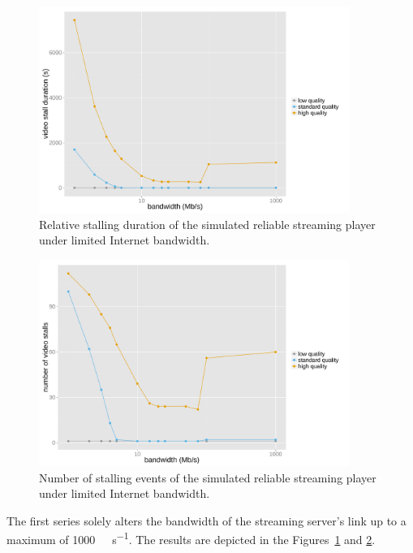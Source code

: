 \begin{figure}[htb]
	\centering
	\includegraphics[width=0.9\textwidth]{images/R-ltesim-bwseries-stallduration.pdf}
	\caption{Relative stalling duration of the simulated reliable streaming player under limited Internet bandwidth.}
\label{c6:fig:ltesim-bwseries-stallduration}
\end{figure}

\begin{figure}[htb]
	\centering
	\includegraphics[width=0.9\textwidth]{images/R-ltesim-bwseries-numstalls.pdf}
	\caption{Number of stalling events of the simulated reliable streaming player under limited Internet bandwidth.}
\label{c6:fig:ltesim-bwseries-numstalls}
\end{figure}

The first series solely alters the bandwidth of the streaming server's link up to a maximum of \SI{1000}{\mega\bit\per\second}. The results are depicted in the Figures~\ref{c6:fig:ltesim-bwseries-stallduration} and \ref{c6:fig:ltesim-bwseries-numstalls}.

